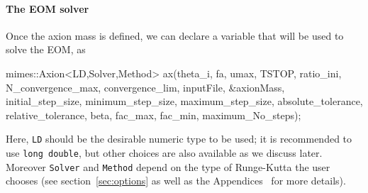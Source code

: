 \documentclass[11pt,a4paper]{article}
\begin{document}
\paragraph{The EOM solver}
Once the axion mass is defined, we can declare a variable that will be used to solve the EOM, as
%
\begin{cpp}
	mimes::Axion<LD,Solver,Method> ax(theta_i, fa, umax, TSTOP, ratio_ini, 
	N_convergence_max, convergence_lim, inputFile, &axionMass, initial_step_size,
	minimum_step_size, maximum_step_size, absolute_tolerance, relative_tolerance, 
	beta, fac_max, fac_min, maximum_No_steps);
\end{cpp}
%
Here, {\tt LD} should be the desirable numeric type to be used; it is recommended to use {\tt long double}, but other choices are also available as we discuss later. Moreover {\tt Solver} and {\tt Method} depend on the type of Runge-Kutta the user chooses (see section~\ref{sec:options} as well as the Appendices~ for more details). 
\end{document}

